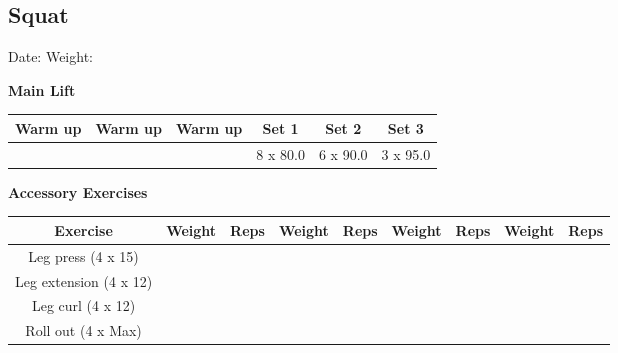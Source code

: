 \documentclass{article}%
\begin{document}
\subsection*{Squat}%
Date: %
\linebreak%
Weight: %
\vspace*{20pt}%
\linebreak%
\begin{minipage}{0.5\textwidth}%
\textbf{Main Lift\newline%
\newline%
}%
\begin{tabular}{|c|c|c|c|c|c|}%
\hline%
Warm up&Warm up&Warm up&Set 1&Set 2&Set 3\\%
\hline%
&&&8 x 80.0&6 x 90.0&3 x 95.0\\%
\hline%
\end{tabular}%
\vspace*{20pt}%
\linebreak%
\textbf{Accessory Exercises\newline%
\newline%
}%
\begin{tabular}{|c|c|c|c|c|c|c|c|c|}%
\hline%
Exercise&Weight&Reps&Weight&Reps&Weight&Reps&Weight&Reps\\%
\hline%
Leg press (4 x 15)&&&&&&&&\\%
\hline%
Leg extension (4 x 12)&&&&&&&&\\%
\hline%
Leg curl (4 x 12)&&&&&&&&\\%
\hline%
Roll out (4 x Max)&&&&&&&&\\%
\hline%
\end{tabular}%
\end{minipage}%
\vspace*{20pt}%
\linebreak

%
\end{document}
